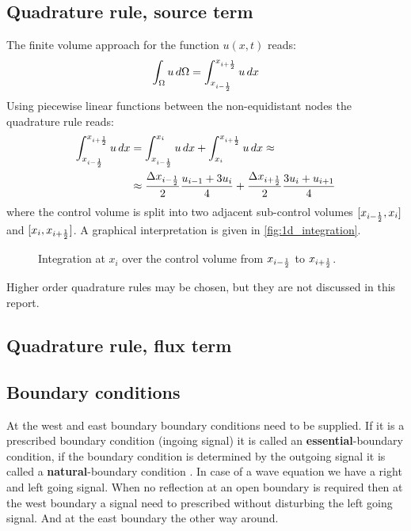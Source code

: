 \subsection{Quadrature rule, source term}\label{sec:source_quadrature_rule}
The finite volume approach for the function $u(x,t)$ reads:
\begin{align}
    \int_\Omega u \, d\Omega = \int_{x_{i-\frac{1}{2}}}^{x_{i+\frac{1}{2}}} u \, dx
\end{align}
Using piecewise linear functions between the non-equidistant nodes the quadrature rule reads:
\begin{align}
    \int_{x_{i-\frac{1}{2}}}^{x_{i+\frac{1}{2}}} u \, dx & = \int_{x_{i-\frac{1}{2}}}^{x_i} u \, dx + \int_{x_i}^{x_{i+\frac{1}{2}}} u \, dx \approx
    \\
    & \approx \frac{\Delta x_{i-\frac{1}{2}}}{2} \frac{u_{i-1} + 3 u_{i}}{4} + \frac{\Delta x_{i+\frac{1}{2}}}{2} \frac{3 u_{i} + u_{i+1}}{4} \label{eq:integral_control_volume}
\end{align}
where the control volume is split into two adjacent sub-control volumes  $[x_{i-\frac{1}{2}}, x_i]$ and $[x_i, x_{i+\frac{1}{2}}]$.
A graphical interpretation is given in \autoref{fig:1d_integration}.
\begin{figure}[H]
    \begin{center}
        \resizebox{0.8\textwidth}{!}{
            
        }
    \end{center}
    \caption{Integration at $x_i$ over the control volume from $x_{i-\frac{1}{2}}$ to $x_{i+\frac{1}{2}}$.}\label{fig:1d_integration}
\end{figure}
Higher order quadrature rules may be chosen, but they are not discussed in this report.
\subsection{Quadrature rule, flux term}\label{sec:flux_quadrature_rule}

\subsection{Boundary conditions}\label{sec:boundary_conditions}
At the west and east boundary boundary conditions need to be supplied.
If it is a prescribed boundary condition (ingoing signal) it is called an \textbf{essential}-boundary condition, if the boundary condition is determined by the outgoing signal it is called a \textbf{natural}-boundary condition \citep{Logan1987,VanKanEtAL2008}.
In case of a wave equation we have a right and left going signal.
When no reflection at an open boundary is required then at the west boundary a signal need to prescribed  without disturbing the left going signal.
And at the east boundary the other way around.

